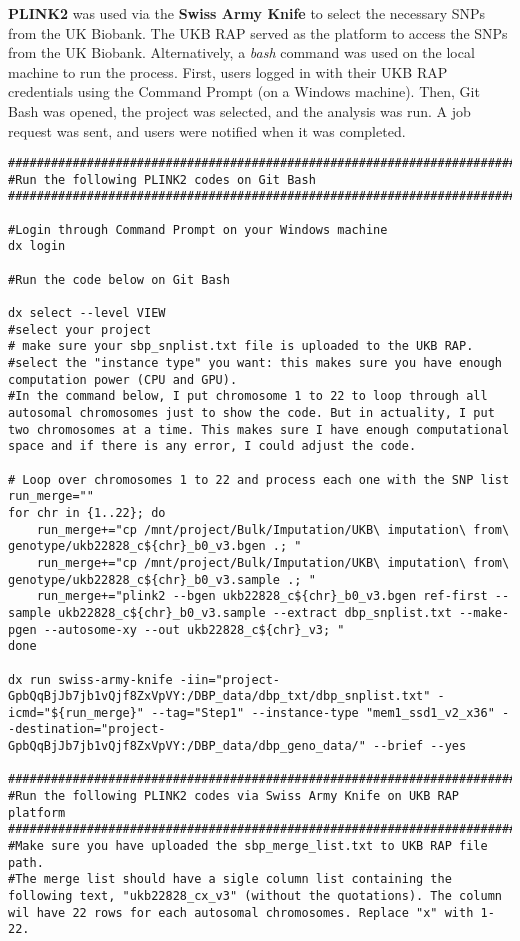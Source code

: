 \documentclass[11pt]{article}
\begin{document}
\textbf{PLINK2} was used via the \textbf{Swiss Army Knife} to select the necessary SNPs from the UK Biobank. The UKB RAP served as the platform to access the SNPs from the UK Biobank. Alternatively, a \textit{bash} command was used on the local machine to run the process. First, users logged in with their UKB RAP credentials using the Command Prompt (on a Windows machine). Then, Git Bash was opened, the project was selected, and the analysis was run. A job request was sent, and users were notified when it was completed.
\begin{lstlisting}[style=BashStyle]
#########################################################################
#Run the following PLINK2 codes on Git Bash 
#########################################################################

#Login through Command Prompt on your Windows machine 
dx login

#Run the code below on Git Bash
 
dx select --level VIEW 
#select your project
# make sure your sbp_snplist.txt file is uploaded to the UKB RAP. 
#select the "instance type" you want: this makes sure you have enough computation power (CPU and GPU). 
#In the command below, I put chromosome 1 to 22 to loop through all autosomal chromosomes just to show the code. But in actuality, I put two chromosomes at a time. This makes sure I have enough computational space and if there is any error, I could adjust the code. 

# Loop over chromosomes 1 to 22 and process each one with the SNP list
run_merge=""
for chr in {1..22}; do
    run_merge+="cp /mnt/project/Bulk/Imputation/UKB\ imputation\ from\ genotype/ukb22828_c${chr}_b0_v3.bgen .; "
    run_merge+="cp /mnt/project/Bulk/Imputation/UKB\ imputation\ from\ genotype/ukb22828_c${chr}_b0_v3.sample .; "
    run_merge+="plink2 --bgen ukb22828_c${chr}_b0_v3.bgen ref-first --sample ukb22828_c${chr}_b0_v3.sample --extract dbp_snplist.txt --make-pgen --autosome-xy --out ukb22828_c${chr}_v3; "
done

dx run swiss-army-knife -iin="project-GpbQqBjJb7jb1vQjf8ZxVpVY:/DBP_data/dbp_txt/dbp_snplist.txt" -icmd="${run_merge}" --tag="Step1" --instance-type "mem1_ssd1_v2_x36" --destination="project-GpbQqBjJb7jb1vQjf8ZxVpVY:/DBP_data/dbp_geno_data/" --brief --yes

#########################################################################
#Run the following PLINK2 codes via Swiss Army Knife on UKB RAP platform 
#########################################################################
#Make sure you have uploaded the sbp_merge_list.txt to UKB RAP file path. 
#The merge list should have a sigle column list containing the following text, "ukb22828_cx_v3" (without the quotations). The column wil have 22 rows for each autosomal chromosomes. Replace "x" with 1-22. 


\end{lstlisting}
\end{document}

